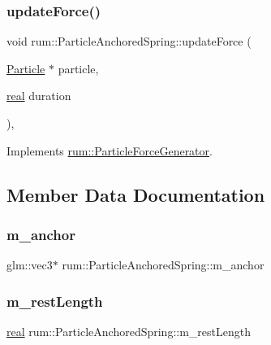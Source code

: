 \subsubsection{\texorpdfstring{update\+Force()}{updateForce()}}
{\footnotesize\ttfamily void rum\+::\+Particle\+Anchored\+Spring\+::update\+Force (\begin{DoxyParamCaption}\item[{\mbox{\hyperlink{classrum_1_1_particle}{Particle}} $\ast$}]{particle,  }\item[{\mbox{\hyperlink{namespacerum_a7e8cca23573d5eaead0f138cbaa4862c}{real}}}]{duration }\end{DoxyParamCaption})\hspace{0.3cm}{\ttfamily [override]}, {\ttfamily [virtual]}}



Implements \mbox{\hyperlink{classrum_1_1_particle_force_generator_af7abcafb9527220988ec4b9dde817b34}{rum\+::\+Particle\+Force\+Generator}}.



\subsection{Member Data Documentation}
\mbox{\label{classrum_1_1_particle_anchored_spring_a33813234e4924860ce0f5ee29efd5c96}} 
\subsubsection{\texorpdfstring{m\+\_\+anchor}{m\_anchor}}
{\footnotesize\ttfamily glm\+::vec3$\ast$ rum\+::\+Particle\+Anchored\+Spring\+::m\+\_\+anchor\hspace{0.3cm}{\ttfamily [protected]}}

\mbox{\label{classrum_1_1_particle_anchored_spring_ae0b4ab273dfd453b9e871ec1371d8ab8}} 
\subsubsection{\texorpdfstring{m\+\_\+rest\+Length}{m\_restLength}}
{\footnotesize\ttfamily \mbox{\hyperlink{namespacerum_a7e8cca23573d5eaead0f138cbaa4862c}{real}} rum\+::\+Particle\+Anchored\+Spring\+::m\+\_\+rest\+Length\hspace{0.3cm}{\ttfamily [protected]}}


